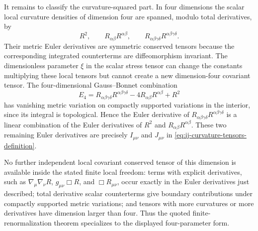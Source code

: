 It remains to classify the curvature-squared part.  In four dimensions the
scalar local curvature densities of dimension four are spanned, modulo total
derivatives, by
\[
  R^2,\qquad R_{\alpha\beta}R^{\alpha\beta},\qquad
  R_{\alpha\beta\gamma\delta}R^{\alpha\beta\gamma\delta}.
\]
Their metric Euler derivatives are symmetric conserved tensors because the
corresponding integrated counterterms are diffeomorphism invariant.  The
dimensionless parameter \(\xi\) in the scalar stress tensor can change the
constants multiplying these local tensors but cannot create a new
dimension-four covariant tensor.  The four-dimensional Gauss--Bonnet combination
\[
  E_4
  =
  R_{\alpha\beta\gamma\delta}R^{\alpha\beta\gamma\delta}
  -4R_{\alpha\beta}R^{\alpha\beta}
  +R^2
\]
has vanishing metric variation on compactly supported variations in the
interior, since its integral is topological.  Hence the Euler derivative of
\(R_{\alpha\beta\gamma\delta}R^{\alpha\beta\gamma\delta}\) is a linear
combination of the Euler derivatives of \(R^2\) and
\(R_{\alpha\beta}R^{\alpha\beta}\).  These two remaining Euler derivatives are
precisely \(I_{\mu\nu}\) and \(J_{\mu\nu}\) in
\eqref{eq:ij-curvature-tensors-definition}.

No further independent local covariant conserved tensor of this dimension is
available inside the stated finite local freedom: terms with explicit
derivatives, such as
\(\nabla_\mu\nabla_\nu R\), \(g_{\mu\nu}\Box R\), and \(\Box R_{\mu\nu}\),
occur exactly in the Euler derivatives just described; total derivative
scalar counterterms give boundary contributions under compactly supported
metric variations; and tensors with more curvatures or more derivatives have
dimension larger than four.  Thus the quoted finite-renormalization theorem
specializes to the displayed four-parameter form.

